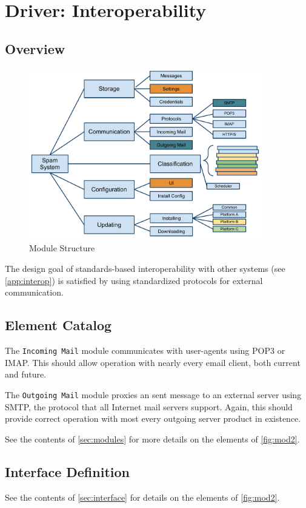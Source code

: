 \documentclass[letterpaper,11pt]{article}
\begin{document}
\section{Driver: Interoperability}
\label{sec:interop}

\subsection{Overview}
\begin{figure}[h]
  \centering
  \includegraphics[width=4in]{ArchModuleDecomp.pdf}
  \caption{Module Structure}
  \label{fig:mod2}
\end{figure}

The design goal of standards-based interoperability with other systems (see
\autoref{app:interop}) is satisfied by using standardized protocols for
external communication.

\subsection{Element Catalog}
The \texttt{Incoming Mail} module communicates with user-agents using POP3 or
IMAP.  This should allow operation with nearly every email client, both
current and future.

The \texttt{Outgoing Mail} module proxies an sent message to an external
server using SMTP, the protocol that all Internet mail servers support.
Again, this should provide correct operation with most every outgoing server
product in existence.

See the contents of \autoref{sec:modules} for more details on the elements of
\autoref{fig:mod2}.

\subsection{Interface Definition}
See the contents of \autoref{sec:interface} for details on the elements of
\autoref{fig:mod2}.
\end{document}
